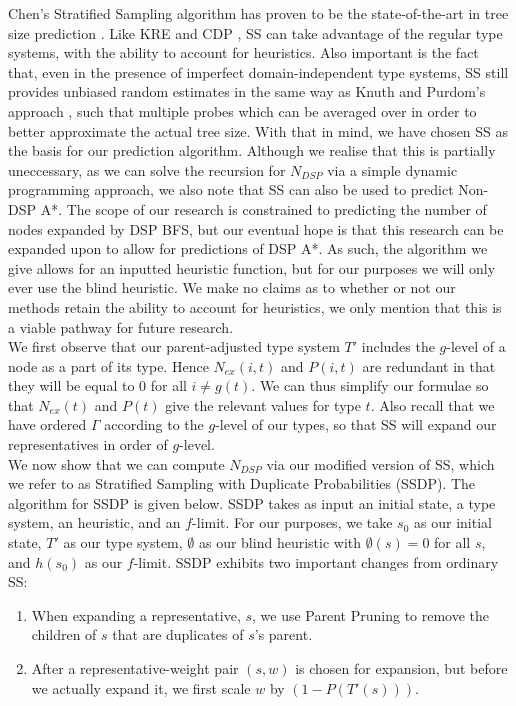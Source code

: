 \documentclass{article}
\begin{document}
Chen's Stratified Sampling algorithm has proven to be the state-of-the-art in tree size prediction \cite{chen1992heuristic, lelis2013predicting}.
Like KRE and CDP \cite{korf2001time, zahavi2010predicting}, SS can take advantage of the regular type systems,
with the ability to account for heuristics.
Also important is the fact that, even in the presence of imperfect domain-independent type systems,
SS still provides unbiased random estimates in the same way as Knuth and Purdom's approach \cite{knuth1975estimating, purdom1978tree},
such that multiple probes which can be averaged over in order to better approximate the actual tree size.
With that in mind, we have chosen SS as the basis for our prediction algorithm.
Although we realise that this is partially uneccessary,
as we can solve the recursion for \(N_{DSP}\) via a simple dynamic programming approach,
we also note that SS can also be used to predict Non-DSP A*.
The scope of our research is constrained to predicting the number of nodes expanded by DSP BFS,
but our eventual hope is that this research can be expanded upon to allow for predictions of DSP A*.
As such, the algorithm we give allows for an inputted heuristic function,
but for our purposes we will only ever use the blind heuristic. We make no claims as
to whether or not our methods retain the ability to account for heuristics, we only
mention that this is a viable pathway for future research. \\

We first observe that our parent-adjusted type system \(T'\) includes the \(g\)-level of a node as a part of its type.
Hence \(N_{ex}(i, t)\) and \(P(i, t)\) are redundant in that they will be equal to 0
for all \(i \not = g(t)\).
We can thus simplify our formulae so that \(N_{ex}(t)\) and \(P(t)\) give the relevant values
for type \(t\). Also recall that we have ordered \(\Gamma\) according to the \(g\)-level of our types,
so that SS will expand our representatives in order of \(g\)-level. \\

We now show that we can compute \(N_{DSP}\)
via our modified version of SS, which we refer to as Stratified Sampling with Duplicate Probabilities (SSDP).
The algorithm for SSDP is given below.
SSDP takes as input an initial state,
a type system,
an heuristic,
and an \(f\)-limit.
For our purposes, we take \(s_0\) as our initial state,
\(T'\) as our type system,
\(\emptyset\) as our blind heuristic with \(\emptyset(s) = 0\) for all \(s\),
and \(h(s_0)\) as our \(f\)-limit.
SSDP exhibits two important changes from ordinary SS:
\begin{enumerate}
\item
  When expanding a representative, \(s\),
  we use Parent Pruning to remove the children of \(s\) that are duplicates of \(s\)'s parent.
\item
  After a representative-weight pair \((s, w)\) is chosen for expansion,
  but before we actually expand it, we first scale \(w\) by \((1 - P(T'(s)))\).
\end{enumerate}
\end{document}
